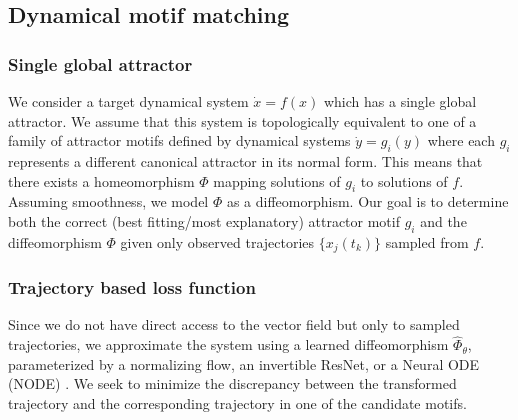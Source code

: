 \documentclass{article}
\newcommand{\ascomment}[1]{\textcolor{ascolor}{(#1)}}
\theoremstyle{definition} \newtheorem{definition}{Definition}  \newtheorem{example}{Example}
\theoremstyle{remark} \newtheorem{remark}{Remark}
\newcounter{ct}
\begin{document}

%

\subsection{Dynamical motif matching}
\subsubsection{Single global attractor}
We consider a target dynamical system $\dot{x} = f(x)$ which has a single global attractor.
 We assume that this system is topologically equivalent to one of a family of attractor motifs defined by dynamical systems $\dot{y} = g_i(y)$ where each $g_i$ represents a different canonical attractor in its normal form.
  This means that there exists a homeomorphism $\Phi$ mapping solutions of $g_i$ to solutions of $f$.
  Assuming smoothness, we model $\Phi$ as a diffeomorphism.
Our goal is to determine both the correct (best fitting/most explanatory) attractor motif $g_i$ and the diffeomorphism $\Phi$ given only observed trajectories $\{x_j(t_k)\}$ sampled from $f$.


\subsubsection{Trajectory based loss function}
Since we do not have direct access to the vector field but only to sampled trajectories, we approximate the system using a learned diffeomorphism \( \hat{\Phi}_\theta \), parameterized by a normalizing flow\citep{kobyzev2020normalizing,papamakarios2021normalizing}, an invertible ResNet\citep{he2016deep}, or a Neural ODE (NODE) \citep{chen2018neural}.
 We seek to minimize the discrepancy between the transformed trajectory and the corresponding trajectory in one of the candidate motifs.
\end{document}
